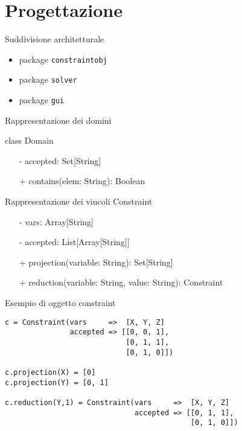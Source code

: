 \section{Progettazione}
\begin{frame}{Suddivisione architetturale}
\begin{itemize}
  \item package \texttt{constraintobj}
  \item package \texttt{solver}
  \item package \texttt{gui}
\end{itemize}
\end{frame}

\begin{frame}{Rappresentazione dei domini}


class Domain
\begin{itemize}
  \item[-] accepted: Set[String]
  \item[+] contains(elem: String): Boolean
\end{itemize}
\end{frame}

\begin{frame}{Rappresentazione dei vincoli}
Constraint
\begin{itemize}
  \item[-] vars: Array[String]
  \item[-] accepted: List[Array[String]]
  \item[+] projection(variable: String): Set[String]
  \item[+] reduction(variable: String, value: String): Constraint
\end{itemize}
\end{frame}

\begin{frame}[fragile]{Esempio di oggetto constraint}
\begin{verbatim}
c = Constraint(vars     =>  [X, Y, Z]
               accepted => [[0, 0, 1],
                            [0, 1, 1],
                            [0, 1, 0]])
                            
c.projection(X) = [0]
c.projection(Y) = [0, 1]

c.reduction(Y,1) = Constraint(vars     =>  [X, Y, Z]
                              accepted => [[0, 1, 1],
                                           [0, 1, 0]])
\end{verbatim}  
\end{frame}
